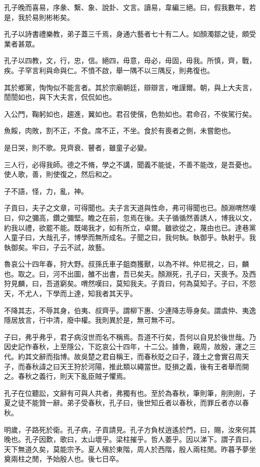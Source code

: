 孔子晚而喜易，序彖、繫、象、說卦、文言。讀易，韋編三絕。曰，假我數年，若是，我於易則彬彬矣。

孔子以詩書禮樂教，弟子蓋三千焉，身通六藝者七十有二人。如顏濁鄒之徒，頗受業者甚眾。

孔子以四教，文，行，忠，信。絕四，毋意，毋必，毋固，毋我。所慎，齊，戰，疾。子罕言利與命與仁。不憤不啟，舉一隅不以三隅反，則弗復也。

其於鄉黨，恂恂似不能言者。其於宗廟朝廷，辯辯言，唯謹爾。朝，與上大夫言，誾誾如也，與下大夫言，侃侃如也。

入公門，鞠躬如也，趨進，翼如也。君召使儐，色勃如也。君命召，不俟駕行矣。

魚餒，肉敗，割不正，不食。席不正，不坐。食於有喪者之側，未嘗飽也。

是日哭，則不歌。見齊衰、瞽者，雖童子必變。

三人行，必得我師。德之不脩，學之不講，聞義不能徙，不善不能改，是吾憂也。使人歌，善，則使復之，然后和之。

子不語，怪，力，亂，神。

子貢曰，夫子之文章，可得聞也。夫子言天道與性命，弗可得聞也已。顏淵喟然嘆曰，仰之彌高，鑽之彌堅。瞻之在前，忽焉在後。夫子循循然善誘人，博我以文，約我以禮，欲罷不能。既竭我才，如有所立，卓爾。雖欲從之，蔑由也已。達巷黨人童子曰，大哉孔子，博學而無所成名。子聞之曰，我何執。執御乎。執射乎。我執御矣。牢曰，子云不試，故藝。

魯哀公十四年春，狩大野。叔孫氏車子鉏商獲獸，以為不祥。仲尼視之，曰，麟也。取之。曰，河不出圖，雒不出書，吾已矣夫。顏淵死，孔子曰，天喪予。及西狩見麟，曰，吾道窮矣。喟然嘆曰，莫知我夫。子貢曰，何為莫知子。子曰，不怨天，不尤人，下學而上達，知我者其天乎。

不降其志，不辱其身，伯夷、叔齊乎。謂柳下惠、少連降志辱身矣。謂虞仲、夷逸隱居放言，行中清，廢中權。我則異於是，無可無不可。

子曰，弗乎弗乎，君子病沒世而名不稱焉。吾道不行矣，吾何以自見於後世哉。乃因史記作春秋，上至隱公，下訖哀公十四年，十二公。據魯，親周，故殷，運之三代。約其文辭而指博。故吳楚之君自稱王，而春秋貶之曰子，踐土之會實召周天子，而春秋諱之曰天王狩於河陽，推此類以繩當世。貶損之義，後有王者舉而開之。春秋之義行，則天下亂臣賊子懼焉。

孔子在位聽訟，文辭有可與人共者，弗獨有也。至於為春秋，筆則筆，削則削，子夏之徒不能贊一辭。弟子受春秋，孔子曰，後世知丘者以春秋，而罪丘者亦以春秋。

明歲，子路死於衛。孔子病，子貢請見。孔子方負杖逍遙於門，曰，賜，汝來何其晚也。孔子因歎，歌曰，太山壞乎。梁柱摧乎。哲人萎乎。因以涕下。謂子貢曰，天下無道久矣，莫能宗予。夏人殯於東階，周人於西階，殷人兩柱閒。昨暮予夢坐奠兩柱之閒，予始殷人也。後七日卒。

